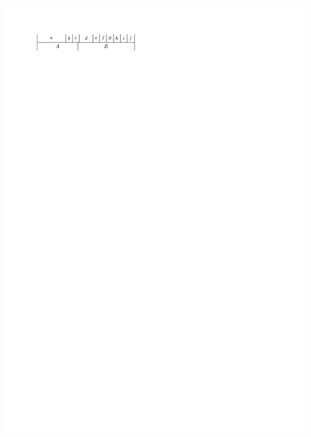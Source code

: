 \documentclass[a4paper]{article}
\begin{document}
\includegraphics[width=\textwidth]{./introduction/img/2sidedAfter.pdf}
\clearpage%
\end{document}
